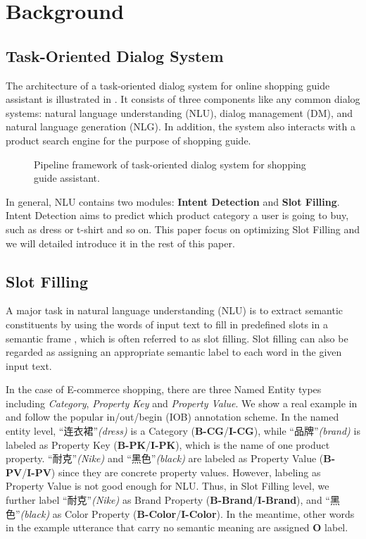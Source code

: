 \section{Background}
\label{sec:background}

\subsection{Task-Oriented Dialog System}
The architecture of a task-oriented dialog system
for online shopping guide assistant is illustrated in .
It consists of three components like any common dialog systems:
natural language understanding (NLU), 
dialog management (DM), 
and natural language generation (NLG).
In addition, the system also interacts with a product search engine
for the purpose of shopping guide. 
\begin{figure}[h]
	\centering
	\caption{Pipeline framework of task-oriented dialog system for shopping guide assistant.}
	\label{fig:dialog-system}
	\vspace{-10pt}
\end{figure}

In general, NLU contains two modules: 
\textbf{Intent Detection} and \textbf{Slot Filling}.
Intent Detection aims to predict which product category 
a user is going to buy,
such as dress or t-shirt and so on.
This paper focus on optimizing Slot Filling
and we will detailed introduce it in the rest of this paper.

\subsection{Slot Filling}
\label{sec:slot_filling}
A major task in natural language understanding (NLU) is to extract semantic constituents
by using the words of input text to fill in predefined slots in a semantic frame \cite{mesnil2015using},
which is often referred to as slot filling.
Slot filling can also be regarded as assigning
an appropriate semantic label to each word in
the given input text.

In the case of E-commerce shopping, 
there are three Named Entity types including 
\emph{Category}, \emph{Property Key} and \emph{Property Value}.
We show a real example in 
and follow the popular in/out/begin (IOB) annotation scheme.
In the named entity level,
``连衣裙''\emph{(dress)} is a Category (\textbf{B-CG}/\textbf{I-CG}),
while ``品牌''\emph{(brand)} is labeled as Property Key
(\textbf{B-PK}/\textbf{I-PK}),
which is the name of one product property.
``耐克''\emph{(Nike)} and ``黑色''\emph{(black)} are labeled as Property Value
(\textbf{B-PV}/\textbf{I-PV}) since they are concrete property values.
However, labeling as Property Value is not good enough for NLU.
Thus, in Slot Filling level, 
we further label ``耐克''\emph{(Nike)} as Brand Property (\textbf{B-Brand}/\textbf{I-Brand}), 
and ``黑色''\emph{(black)} as 
Color Property (\textbf{B-Color}/\textbf{I-Color}).
In the meantime, 
other words in the example utterance that carry no semantic meaning are assigned \textbf{O} label.

